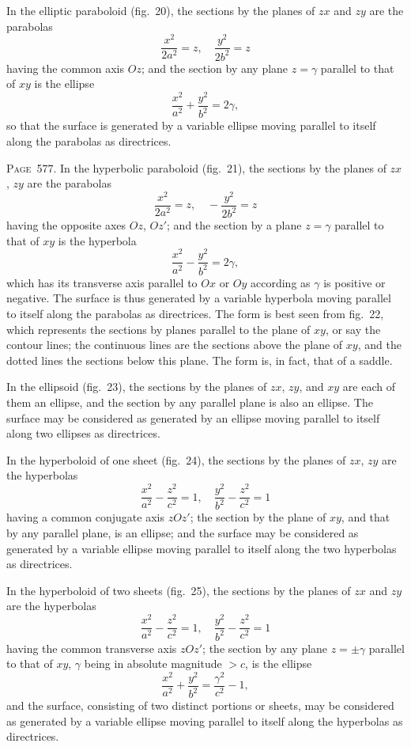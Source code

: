 \documentclass[11pt,a4paper]{book}
\begin{document}
In the elliptic paraboloid (fig.~20), the sections by the planes of $zx$ and $zy$ are the parabolas
\[
\frac{x^2}{2a^2}=z,\quad \frac{y^2}{2b^2}=z
\]
having the common axis $Oz$; and the section by any plane $z=\gamma$ parallel to that of $xy$ is the ellipse
\[
\frac{x^2}{a^2}+\frac{y^2}{b^2}=2\gamma,
\]
so that the surface is generated by a variable ellipse moving parallel to itself along the parabolas as directrices.

\newpage
\noindent\textsc{Page~577.} In the hyperbolic paraboloid (fig.~21), the sections by the planes of $zx$, $zy$ are the parabolas
\[
\frac{x^2}{2a^2}=z,\quad -\frac{y^2}{2b^2}=z
\]
having the opposite axes $Oz$, $Oz'$; and the section by a plane $z=\gamma$ parallel to that of $xy$ is the hyperbola
\[
\frac{x^2}{a^2}-\frac{y^2}{b^2}=2\gamma,
\]
which has its transverse axis parallel to $Ox$ or $Oy$ according as $\gamma$ is positive or negative. The surface is thus generated by a variable hyperbola moving parallel to itself along the parabolas as directrices. The form is best seen from fig.~22, which represents the sections by planes parallel to the plane of $xy$, or say the contour lines; the continuous lines are the sections above the plane of $xy$, and the dotted lines the sections below this plane. The form is, in fact, that of a saddle.

In the ellipsoid (fig.~23), the sections by the planes of $zx$, $zy$, and $xy$ are each of them an ellipse, and the section by any parallel plane is also an ellipse. The surface may be considered as generated by an ellipse moving parallel to itself along two ellipses as directrices.

In the hyperboloid of one sheet (fig.~24), the sections by the planes of $zx$, $zy$ are the hyperbolas
\[
\frac{x^2}{a^2}-\frac{z^2}{c^2}=1,\quad \frac{y^2}{b^2}-\frac{z^2}{c^2}=1
\]
having a common conjugate axis $zOz'$; the section by the plane of $xy$, and that by any parallel plane, is an ellipse; and the surface may be considered as generated by a variable ellipse moving parallel to itself along the two hyperbolas as directrices.

In the hyperboloid of two sheets (fig.~25), the sections by the planes of $zx$ and $zy$ are the hyperbolas
\[
\frac{x^2}{a^2}-\frac{z^2}{c^2}=1,\quad \frac{y^2}{b^2}-\frac{z^2}{c^2}=1
\]
having the common transverse axis $zOz'$; the section by any plane $z=\pm\gamma$ parallel to that of $xy$, $\gamma$ being in absolute magnitude $>c$, is the ellipse
\[
\frac{x^2}{a^2}+\frac{y^2}{b^2}=\frac{\gamma^2}{c^2}-1,
\]
and the surface, consisting of two distinct portions or sheets, may be considered as generated by a variable ellipse moving parallel to itself along the hyperbolas as directrices.
\end{document}
